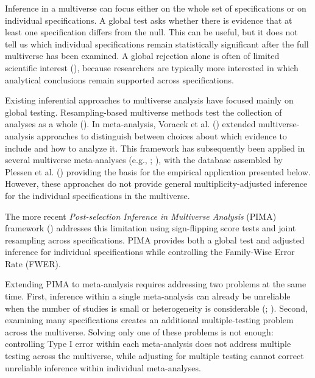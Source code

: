\documentclass[
  man,
  longtable,
  nolmodern,
  notxfonts,
  notimes,
  colorlinks=true,linkcolor=blue,citecolor=blue,urlcolor=blue]{apa7}
\begin{document}
Inference in a multiverse can focus either on the whole set of
specifications or on individual specifications. A global test asks
whether there is evidence that at least one specification differs from
the null. This can be useful, but it does not tell us which individual
specifications remain statistically significant after the full
multiverse has been examined. A global rejection alone is often of
limited scientific interest (), because researchers are typically more
interested in which analytical conclusions remain supported across
specifications.

Existing inferential approaches to multiverse analysis have focused
mainly on global testing. Resampling-based multiverse methods test the
collection of analyses as a whole
(). In
meta-analysis, Voracek et al. ()
extended multiverse-analysis approaches to distinguish between choices
about which evidence to include and how to analyze it. This framework
has subsequently been applied in several multiverse meta-analyses (e.g.,
;
), with the database
assembled by Plessen et al. ()
providing the basis for the empirical application presented below.
However, these approaches do not provide general multiplicity-adjusted
inference for the individual specifications in the multiverse.

The more recent \emph{Post-selection Inference in Multiverse Analysis}
(PIMA) framework ()
addresses this limitation using sign-flipping score tests and joint
resampling across specifications. PIMA provides both a global test and
adjusted inference for individual specifications while controlling the
Family-Wise Error Rate (FWER).

Extending PIMA to meta-analysis requires addressing two problems at the
same time. First, inference within a single meta-analysis can already be
unreliable when the number of studies is small or heterogeneity is
considerable (; ).
Second, examining many specifications creates an additional
multiple-testing problem across the multiverse. Solving only one of
these problems is not enough: controlling Type I error within each
meta-analysis does not address multiple testing across the multiverse,
while adjusting for multiple testing cannot correct unreliable inference
within individual meta-analyses.
\end{document}
